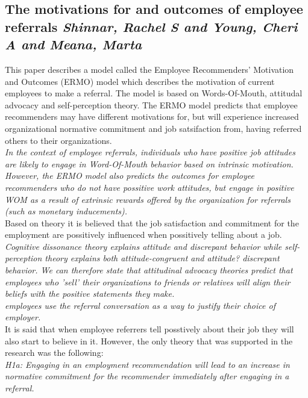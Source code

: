 \documentclass[a4paper, 11pt]{article} %
\begin{document}
\subsection*{The motivations for and outcomes of employee referrals  \emph{Shinnar, Rachel S and Young, Cheri A and Meana, Marta} \cite{ninth}}

This paper describes a model called the Employee Recommenders' Motivation and Outcomes (ERMO) model which describes the motivation of current employees to make a referral. The model is based on Words-Of-Mouth, attitudal advocacy and self-perception theory. The ERMO model predicts that employee recommenders may have different motivations for, but will experience increased organizational normative commitment and job satsifaction from, having referred others to their organizations. \\

\emph{In the context of employee referrals, individuals who have positive job attitudes are likely to engage in Word-Of-Mouth
behavior based on intrinsic motivation. However, the ERMO model also
predicts the outcomes for employee recommenders who do not have possitive work attitudes, but engage in positive WOM as a result of extrinsic
rewards offered by the organization for referrals (such as monetary
inducements).} \\

Based on theory it is believed that the job satisfaction and commitment for the employment are possitively influenced when possitively telling about a job. \\

\emph{Cognitive dissonance theory explains attitude and discrepant behavior while self-perception theory explains
both attitude-congruent and attitude? discrepant behavior. We can
therefore state that attitudinal advocacy theories predict that employees
who 'sell' their organizations to friends or relatives will align their beliefs
with the positive statements they make. } \\

\emph{employees use the referral
conversation as a way to justify their choice of employer.}\\

It is said that when employee referrers tell posstively about their job they will also start to believe in it.
However, the only theory that was supported in the research was the following: \\

\emph{H1a: Engaging in an employment recommendation will lead to an
increase in normative commitment for the recommender immediately after engaging in a referral. }\\
\end{document}
